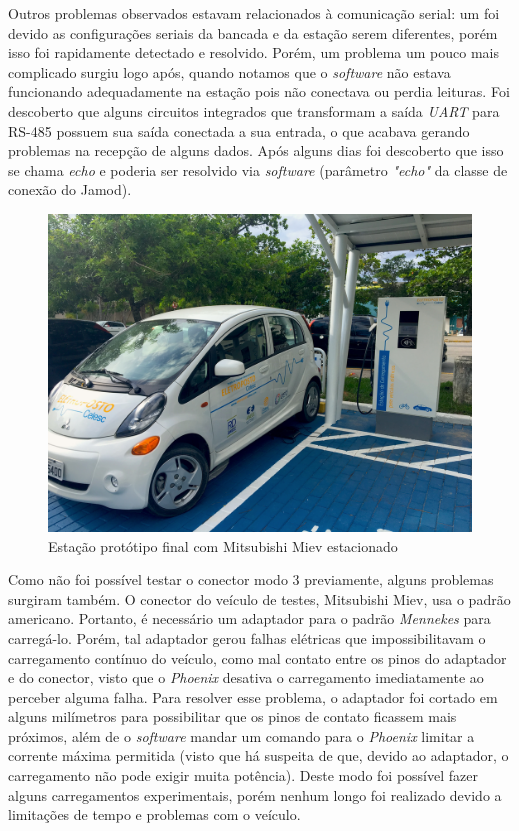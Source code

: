     Outros problemas observados estavam relacionados à comunicação serial: um foi devido as configurações seriais da bancada e da estação serem diferentes, porém isso foi rapidamente detectado e resolvido. Porém, um problema um pouco mais complicado surgiu logo após, quando notamos que o \textit{software} não estava funcionando adequadamente na estação pois não conectava ou perdia leituras. Foi descoberto que alguns circuitos integrados que transformam a saída \textit{\ac{UART}} para RS-485 possuem sua saída conectada a sua entrada, o que acabava gerando problemas na recepção de alguns dados. Após alguns dias foi descoberto que isso se chama \textit{echo} e poderia ser resolvido via \textit{software} (parâmetro \textit{"echo"} da classe de conexão do Jamod).

    \begin{figure}[H]
      \begin{center}
        \includegraphics[width=.75\textwidth,natwidth=4032,natheight=3024]{assets/images/evse.jpg}
        \caption{Estação protótipo final com Mitsubishi Miev estacionado}
        \label{fig:evse}
      \end{center}
    \end{figure}

    Como não foi possível testar o conector modo 3 previamente, alguns problemas surgiram também. O conector do veículo de testes, Mitsubishi Miev, usa o padrão americano. Portanto, é necessário um adaptador para o padrão \textit{Mennekes} para carregá-lo. Porém, tal adaptador gerou falhas elétricas que impossibilitavam o carregamento contínuo do veículo, como mal contato entre os pinos do adaptador e do conector, visto que o \textit{Phoenix} desativa o carregamento imediatamente ao perceber alguma falha. Para resolver esse problema, o adaptador foi cortado em alguns milímetros para possibilitar que os pinos de contato ficassem mais próximos, além de o \textit{software} mandar um comando para o \textit{Phoenix} limitar a corrente máxima permitida (visto que há suspeita de que, devido ao adaptador, o carregamento não pode exigir muita potência). Deste modo foi possível fazer alguns carregamentos experimentais, porém nenhum longo foi realizado devido a limitações de tempo e problemas com o veículo.

